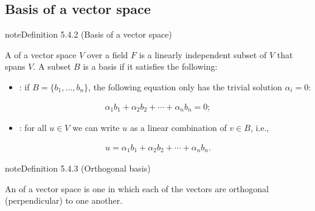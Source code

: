 \documentclass[letterpaper,10pt,english]{jupyterBook}
\begin{document}
\subsection{Basis of a vector space}
\label{\detokenize{_pages/5.4_Basis:basis-of-a-vector-space}}\label{_pages/5.4_Basis:basis-definition}
\begin{sphinxadmonition}{note}{Definition 5.4.2 (Basis of a vector space)}



\sphinxAtStartPar
A  of a vector space \(V\) over a field \(F\) is a linearly independent subset of \(V\) that spans \(V\). A subset \(B\) is a basis if it satisfies the following:
\begin{itemize}
\item {} 
\sphinxAtStartPar
{\hyperref[\detokenize{_pages/5.3_Linear_dependence:linear-dependence-definition}]{}}: if \(B = \{b_1, \ldots , b_n\}\), the following equation only has the trivial solution \(\alpha_i = 0\):

\end{itemize}
\begin{equation*}
\begin{split} \alpha_1 b_1 + \alpha_2 b_2 + \cdots + \alpha_n b_n = 0; \end{split}
\end{equation*}\begin{itemize}
\item {} 
\sphinxAtStartPar
{\hyperref[\detokenize{_pages/5.4_Basis:spanning-set-definition}]{}}: for all \(u \in V\) we can write \(u\) as a linear combination of \(v \in B\), i.e.,

\end{itemize}
\begin{equation*}
\begin{split} u = \alpha_1 b_1 + \alpha_2 b_2 + \cdots + \alpha_n b_n. \end{split}
\end{equation*}\end{sphinxadmonition}

\ignorespaces \label{_pages/5.4_Basis:orthogonal-basis-definition}
\begin{sphinxadmonition}{note}{Definition 5.4.3 (Orthogonal basis)}



\sphinxAtStartPar
An  of a vector space is one in which each of the vectors are orthogonal (perpendicular) to one another.
\end{sphinxadmonition}
\end{document}
